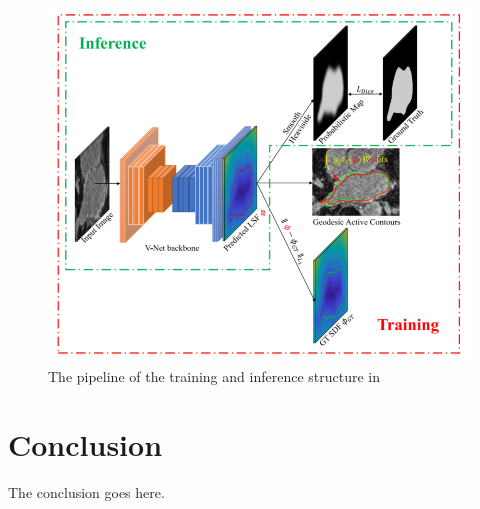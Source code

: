 \documentclass[journal]{IEEEtran}
\begin{document}
\begin{figure}[htp] 
	\centering
	\includegraphics[width=1\linewidth]{../imgs/gseg.png}%
	\caption{The pipeline of the training and inference structure in \cite{gsnake}}
	\label{fig:gseg}
\end{figure}
\section{Conclusion}
The conclusion goes here.\cite{han2020survey}

\ifCLASSOPTIONcaptionsoff
  \newpage
\fi



\end{document}
